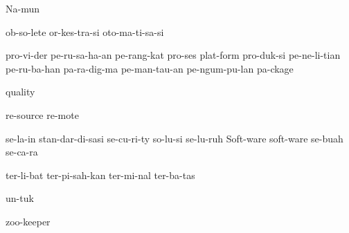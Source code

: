 {  %
  Na-mun
  
  ob-so-lete
  or-kes-tra-si
  oto-ma-ti-sa-si
  
  pro-vi-der
  pe-ru-sa-ha-an
  pe-rang-kat
  pro-ses
  plat-form
  pro-duk-si
  pe-ne-li-tian
  pe-ru-ba-han
  pa-ra-dig-ma
  pe-man-tau-an
  pe-ngum-pu-lan
  pa-ckage
  
  quality
  
  re-source
  re-mote
  
  se-la-in
  stan-dar-di-sasi
  se-cu-ri-ty
  so-lu-si
  se-lu-ruh
  Soft-ware
  soft-ware
  se-buah
  se-ca-ra
  
  
  ter-li-bat
  ter-pi-sah-kan
  ter-mi-nal
  ter-ba-tas
  
  un-tuk
  
  
  
  
  
  zoo-keeper
}
